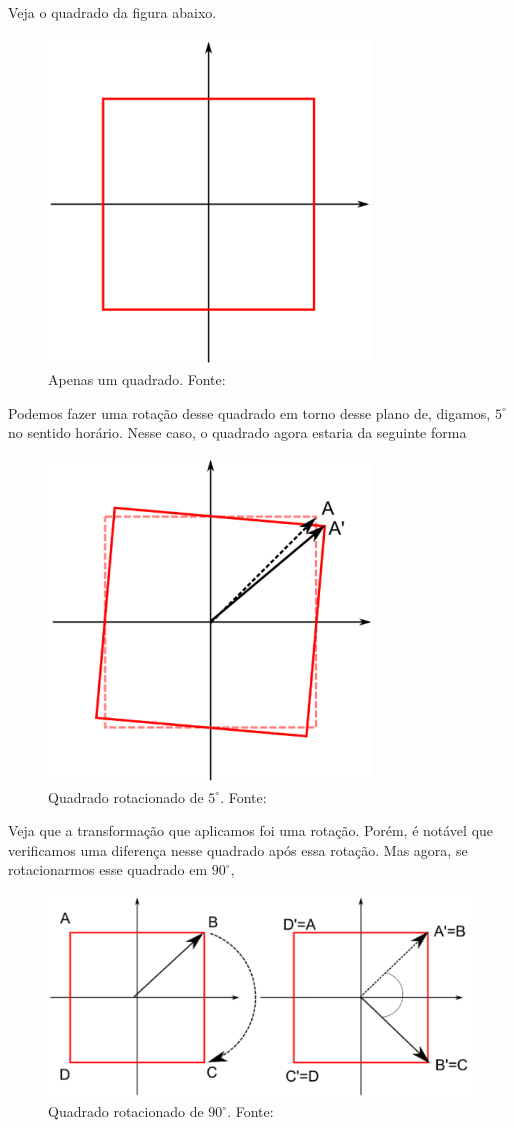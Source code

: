 \documentclass{article}
\numberwithin{equation}{section}
\numberwithin{figure}{section}
\begin{document}
Veja o quadrado da figura abaixo. 
\begin{figure}[H]
	\centering
	\includegraphics[scale=0.4]{figures/square.png}
	\caption{Apenas um quadrado. Fonte:\cite{jakob} }
\end{figure}
Podemos fazer uma rotação desse quadrado em torno desse plano de, digamos, $5^{\circ}$ no sentido horário. Nesse caso, o quadrado agora estaria da seguinte forma 
\begin{figure}[H]
	\centering
	\includegraphics[scale=0.4]{figures/square5.png}
	\caption{Quadrado rotacionado de $5^{\circ}$. Fonte:\cite{jakob} }
\end{figure}
Veja que a transformação que aplicamos foi uma rotação. Porém, é notável que verificamos uma diferença nesse quadrado após essa rotação. Mas agora, se rotacionarmos esse quadrado em $90^{\circ}$, 
\begin{figure}[H]
	\centering
	\includegraphics[scale=0.4]{figures/square90.png}
	\caption{Quadrado rotacionado de $90^{\circ}$. Fonte:\cite{jakob} }
\end{figure}
\end{document}

